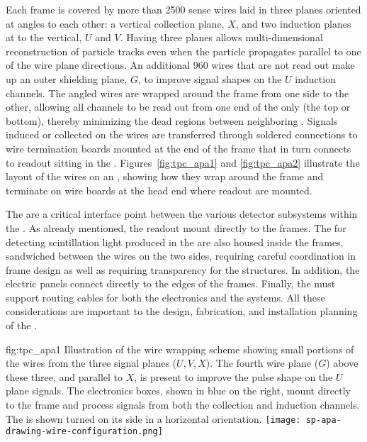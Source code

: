 Each  frame is covered by more than \num{2500} sense wires laid in three planes  oriented at angles to each other: a vertical collection plane, $X$, and two induction planes at \apainducwireangle to the vertical, $U$ and $V$. Having three planes allows multi-dimensional reconstruction of particle tracks even when the particle propagates parallel to one of the wire plane directions.  An additional \num{960} wires that are not read out make up an outer shielding plane, $G$, to improve signal shapes on the $U$ induction channels.  The angled wires are wrapped around the frame from one side to the other, allowing all channels to be read out from one end of the  only (the top or bottom), thereby minimizing the dead regions between neighboring . Signals induced or collected on the wires are transferred through soldered connections to wire termination boards mounted at the end of the  frame that in turn connects to  readout  sitting in the .  Figures~\ref{fig:tpc_apa1} and \ref{fig:tpc_apa2} illustrate the layout of the wires on an , showing how they wrap around the frame and terminate on wire boards at the head end where readout  are mounted.

The  are a critical interface point between the various detector subsystems within the .  As already mentioned, the  readout  mount directly to the  frames.  The  for detecting scintillation light produced in the  are also housed inside the frames, sandwiched between the wires on the two sides, requiring careful coordination in frame design as well as requiring transparency for the  structures.  In addition, the electric  panels connect directly to the edges of the  frames.  Finally, the  must support routing cables for both the  electronics and the  systems. All these considerations are important to the design, fabrication, and installation planning of the .

\begin{dunefigure}{fig:tpc_apa1}
{Illustration of the   wire wrapping scheme showing small portions of the wires from the three signal planes ($U,V,X$). The fourth wire plane ($G$) above these three, and parallel to $X$, is present to improve the pulse shape on the $U$ plane signals. The  electronics boxes, shown in blue on the right, mount directly to the frame and process signals from both the collection and induction channels. The  is shown turned on its side in a horizontal orientation.} 
\texttt{[image: sp-apa-drawing-wire-configuration.png]} 
\end{dunefigure} 

